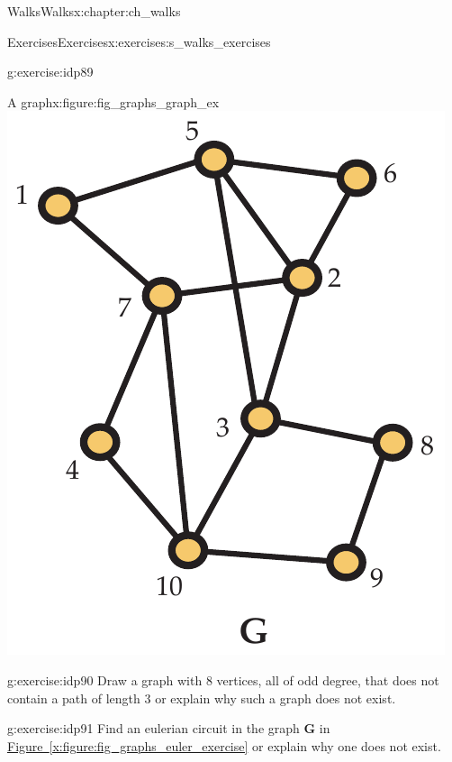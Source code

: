 \documentclass[oneside,10pt,]{book}
\newcommand{\xreffont}{\relax}
\numberwithin{equation}{section}
\newcommand{\bfG}{\mathbf{G}}
\begin{document}
\begin{chapterptx}{Walks}{}{Walks}{}{}{x:chapter:ch_walks}
\begin{exercises-section}{Exercises}{}{Exercises}{}{}{x:exercises:s_walks_exercises}
\begin{divisionexercise}{1}{}{}{g:exercise:idp89}
\begin{sidebyside}{2}{0.0125}{0.0125}{0.025}
\begin{sbspanel}{0.6}
\begin{enumerate}[label=(\alph*)]
\end{enumerate}
\end{sbspanel}%
\begin{sbspanel}{0.35}%
\begin{figureptx}{A graph}{x:figure:fig_graphs_graph_ex}{}%
\includegraphics[width=\linewidth]{images/graph_ex}
\tcblower
\end{figureptx}%
\end{sbspanel}%
\end{sidebyside}%
\end{divisionexercise}%
\begin{divisionexercise}{2}{}{}{g:exercise:idp90}%
Draw a graph with \(8\) vertices, all of odd degree, that does not contain a path of length \(3\) or explain why such a graph does not exist.%
\end{divisionexercise}%
\begin{divisionexercise}{3}{}{}{g:exercise:idp91}%
Find an eulerian circuit in the graph \(\bfG\) in \hyperref[x:figure:fig_graphs_euler_exercise]{Figure~{\xreffont\ref{x:figure:fig_graphs_euler_exercise}}} or explain why one does not exist.%

\end{divisionexercise}
\end{exercises-section}
\end{chapterptx}
\end{document}
